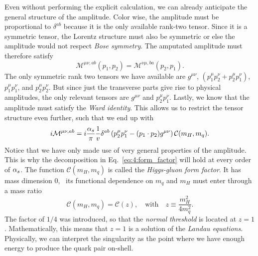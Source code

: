 Even without performing the explicit calculation, we can already anticipate the general structure of the amplitude. Color wise, the amplitude must be proportional to $\delta^{ab}$ because it is the only available rank-two tensor. Since it is a symmetric tensor, the Lorentz structure must also be symmetric or else the amplitude would not respect \textit{Bose symmetry}. The amputated amplitude must therefore satisfy
\begin{equation}
\mathcal{M}^{\mu \nu, ab} (p_1, p_2) = \mathcal{M}^{\nu \mu, ba } (p_2, p_1).
\end{equation}
The only symmetric rank two tensors we have available are $g^{\mu\nu}$, $(p_1^\mu p_2^\nu + p_2^\mu p_1^\nu)$, $p_1^\mu p_1^\nu$, and $p_2^\mu p_2^\nu$. But since just the transverse parts give rise to physical amplitudes, the only relevant tensors are $g^{\mu \nu}$ and $p_2^\mu p_1^\nu$. Lastly, we know that the amplitude must satisfy the \textit{Ward identity}. This allows us to restrict the tensor structure even further, such that we end up with
\begin{equation}
i \mathcal{M}^{\mu \nu, ab} = i\frac{\alpha_s}{\pi} \frac{1}{v} \delta^{ab} \left(p_2^\mu p_1^\nu - (p_1 \cdot p_2)g^{\mu\nu} \right) \mathcal{C}(m_H, m_q).
\label{eq:4:form_factor}
\end{equation}
Notice that we have only made use of very general properties of the amplitude. This is why the decomposition in Eq.~\eqref{eq:4:form_factor} will hold at every order of $\alpha_s$. The function $\mathcal{C}(m_H, m_q)$ is called the \textit{Higgs-gluon form factor}. It has mass dimension 0, \ie\ its functional dependence on $m_q$ and $m_H$ must enter through a mass ratio
\begin{equation}
\mathcal{C} (m_H, m_q) = \mathcal{C}(z), \quad \text{with} \quad z \equiv \frac{m_H^2}{4 m_q^2}.
\end{equation}
The factor of $1/4$ was introduced, so that the \textit{normal threshold} is located at $z = 1$. Mathematically, this means that $z = 1$ is a solution of the \textit{Landau equations}. Physically, we can interpret the singularity as the point where we have enough energy to produce the quark pair on-shell.

